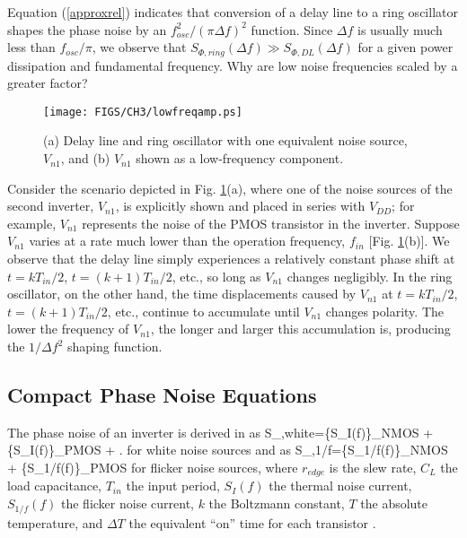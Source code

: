 Equation (\ref{approxrel}) indicates that conversion of a delay line to a ring oscillator shapes the phase noise by an $f_{osc}^2/(\pi \Delta f)^2$ function. 
Since $\Delta f$ is usually much less than $f_{osc}/\pi$, we observe that $S_{\Phi,ring}(\Delta f) \gg S_{\Phi,DL}(\Delta f)$
for a given power dissipation and fundamental frequency.
Why are low
noise frequencies scaled by a greater factor? 
\begin{figure}[htb!]
\centering
\texttt{[image: FIGS/CH3/lowfreqamp.ps]}
\caption{(a) Delay line and ring oscillator with one equivalent noise source, $V_{n1}$, and (b) $V_{n1}$ shown as a low-frequency component.}
\label{fig:lowfreqamp}
\end{figure}
Consider the scenario depicted in Fig. \ref{fig:lowfreqamp}(a), where one of the noise sources of the second inverter, $V_{n1}$, is
explicitly shown and placed in series with $V_{DD}$; for example, $V_{n1}$ represents the noise of the PMOS transistor in the inverter. Suppose $V_{n1}$ varies at a
rate much lower than the operation frequency, $f_{in}$ [Fig. \ref{fig:lowfreqamp}(b)]. We observe that the delay line simply experiences a relatively constant phase shift at $t=kT_{in}/2$,
$t=(k+1)T_{in}/2$, etc., so long as $V_{n1}$ changes negligibly. In the ring oscillator, on the other hand, the time displacements caused by $V_{n1}$ at
$t=kT_{in}/2$, $t=(k+1)T_{in}/2$, etc., continue to accumulate until $V_{n1}$ changes polarity. The lower the frequency of $V_{n1}$, the longer and larger this
accumulation is, producing the $1/\Delta f^2$ shaping function.



\subsection{Compact Phase Noise Equations}

The phase noise of an
inverter is derived in \cite{Homayoun} as
\beq
S_{\Phi,white}=\left\{S_{I}(f)\right\}_{NMOS} + \left\{S_{I}(f)\right\}_{PMOS} + .
\label{sphiwinverter}
\eeq
for white noise sources and as 
\beq
S_{\Phi,1/f}=\left\{S_{1/f}(f)\right\}_{NMOS} + \left\{S_{1/f}(f)\right\}_{PMOS}
\label{sphi1/finverter}
\eeq
for flicker noise sources, where $r_{edge}$ is the slew rate, $C_L$ the load capacitance, $T_{in}$ the input period, $S_I(f)$ the thermal noise
current, $S_{1/f}(f)$ the flicker noise current, $k$ the Boltzmann constant, $T$ the absolute temperature, and $\Delta T$ the equivalent ``on'' time for each
transistor \cite{Homayoun}.

